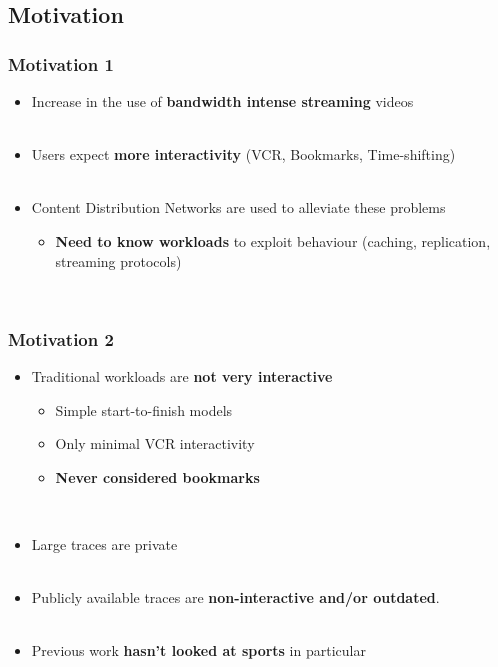 \documentclass[xcolor=pdftex,dvipsnames,table]{beamer}
\begin{document}
\subsection{Motivation}

\begin{frame}
    \frametitle{Motivation 1}

    \begin{itemize}
        \item Increase in the use of \textbf{bandwidth intense streaming} videos~\\~\\
        \item Users expect \textbf{more interactivity} (VCR, Bookmarks, Time-shifting)~\\~\\

        \item Content Distribution Networks are used to alleviate these problems
        \begin{itemize}
            \item \textbf{Need to know workloads} to exploit behaviour (caching, replication, streaming protocols)
        \end{itemize}~\\

    \end{itemize}
\end{frame}

\begin{frame}
    \frametitle{Motivation 2}

    \begin{itemize}
        \item Traditional workloads are \textbf{not very interactive}
        \begin{itemize}
            \item Simple start-to-finish models
            \item Only minimal VCR interactivity
            \item \textbf{Never considered bookmarks}
        \end{itemize}~\\

        \item Large traces are private~\\~\\
        \item Publicly available traces are \textbf{non-interactive and/or outdated}.~\\~\\
        \item Previous work \textbf{hasn't looked at sports} in particular~\\~\\
    \end{itemize}
\end{frame}
\end{document}
